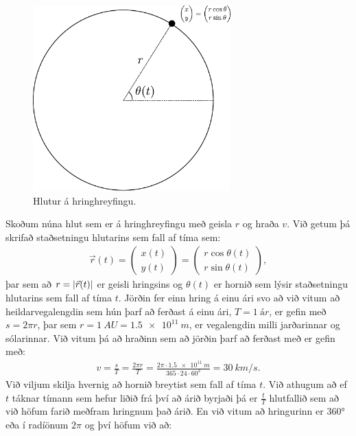 \ifdefined \wholebook \else\documentclass[oneside]{book}\usepackage{EdlBook}\graphicspath{{figures/}}
\begin{document}
\begin{minipage}{\linewidth}
\begin{figure}
\vspace{-1cm}
\includegraphics[width=3in]{figures/hringhreyfing2.pdf}
\caption{Hlutur á hringhreyfingu.}
\label{fig:fnun}
\end{figure}

Skoðum núna hlut sem er á hringhreyfingu með geisla $r$ og hraða $v$. Við getum þá skrifað staðsetningu hlutarins sem fall af tíma sem:
\begin{align*}
    \vec{r}(t) = \begin{pmatrix} x(t) \\ y(t) \end{pmatrix} = \begin{pmatrix} r\cos\theta(t) \\ r\sin\theta(t) \end{pmatrix},
\end{align*}
þar sem að $r = \abs{\vec{r}(t)}$ er geisli hringsins og $\theta(t)$ er hornið sem lýsir staðsetningu hlutarins sem fall af tíma $t$. Jörðin fer einn hring á einu ári svo að við vitum að heildarvegalengdin sem hún þarf að ferðast á einu ári, $T = \SI{1}{ár}$, er gefin með $s = 2\pi r$, þar sem $r = \SI{1}{AU} = \SI{1.5e11}{m}$, er vegalengdin milli jarðarinnar og sólarinnar. Við vitum þá að hraðinn sem að jörðin þarf að ferðast með er gefin með:
\begin{align*}
    v = \frac{s}{T} = \frac{2\pi r}{T} = \frac{2 \pi \cdot \SI{1.5e11}{m}}{365 \cdot 24 \cdot 60^2} = \SI{30}{km/s}.
\end{align*}
Við viljum skilja hvernig að hornið breytist sem fall af tíma $t$. Við athugum að ef $t$ táknar tímann sem hefur liðið frá því að árið byrjaði þá er $\frac{t}{T}$ hlutfallið sem að við höfum farið meðfram hringnum það árið. En við vitum að hringurinn er $\ang{360}$ eða í radíönum $2\pi$ og því höfum við að:
\end{minipage}
\end{document}
